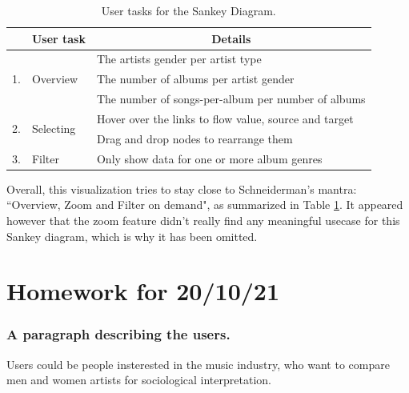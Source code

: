 \documentclass[a4paper, 11pt, oneside]{article}
\begin{document}
\begin{table}[ht]
    \centering
    \begin{tabular}{lll}
        \toprule
        & \multicolumn{1}{c}{\textbf{User task}} & \multicolumn{1}{c}{\textbf{Details}}                  \\ \midrule
        \multirow{3}{*}{1.} & \multirow{3}{*}{Overview}              & The artists gender per artist type                    \\
        &                                        & The number of albums per artist gender                \\
        &                                        & The number of songs-per-album per number of albums    \\ \midrule
        \multirow{2}{*}{2.} & \multirow{2}{*}{Selecting}             & Hover over the links to flow value, source and target \\
        &                                        & Drag and drop nodes to rearrange them                 \\ \midrule
        3.                  & Filter                                 & Only show data for one or more album genres           \\ \bottomrule
    \end{tabular}
    \caption{User tasks for the Sankey Diagram.}
    \label{tab:Joris_user_tasks}
\end{table}

Overall, this visualization tries to stay close to Schneiderman's mantra: ``Overview, Zoom and Filter on demand", as summarized in Table \ref{tab:Joris_user_tasks}. It appeared however that the zoom feature didn't really find any meaningful usecase for this Sankey diagram, which is why it has been omitted.


\cleardoublepage


\newpage


\section{Homework for 20/10/21}

\subsubsection*{A paragraph describing the users.}
Users could be people insterested in the music industry, who want to compare men and women artists for sociological interpretation.
\end{document}
